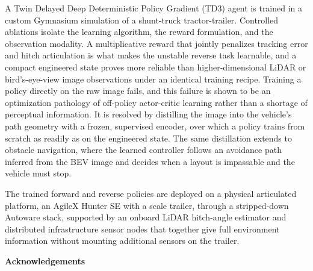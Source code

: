 \documentclass[12pt]{report}
\begin{document}
A Twin Delayed Deep Deterministic Policy Gradient (TD3) agent is trained in a custom Gymnasium simulation of a shunt-truck tractor-trailer. Controlled ablations isolate the learning algorithm, the reward formulation, and the observation modality. A multiplicative reward that jointly penalizes tracking error and hitch articulation is what makes the unstable reverse task learnable, and a compact engineered state proves more reliable than higher-dimensional LiDAR or bird's-eye-view image observations under an identical training recipe. Training a policy directly on the raw image fails, and this failure is shown to be an optimization pathology of off-policy actor-critic learning rather than a shortage of perceptual information. It is resolved by distilling the image into the vehicle's path geometry with a frozen, supervised encoder, over which a policy trains from scratch as readily as on the engineered state. The same distillation extends to obstacle navigation, where the learned controller follows an avoidance path inferred from the BEV image and decides when a layout is impassable and the vehicle must stop.

The trained forward and reverse policies are deployed on a physical articulated platform, an AgileX Hunter SE with a scale trailer, through a stripped-down Autoware stack, supported by an onboard LiDAR hitch-angle estimator and distributed infrastructure sensor nodes that together give full environment information without mounting additional sensors on the trailer.
\clearpage

\begin{center}\textbf{Acknowledgements}\end{center}
\vspace{1em}

\clearpage

\tableofcontents

\listoffigures

\listoftables
\end{document}
